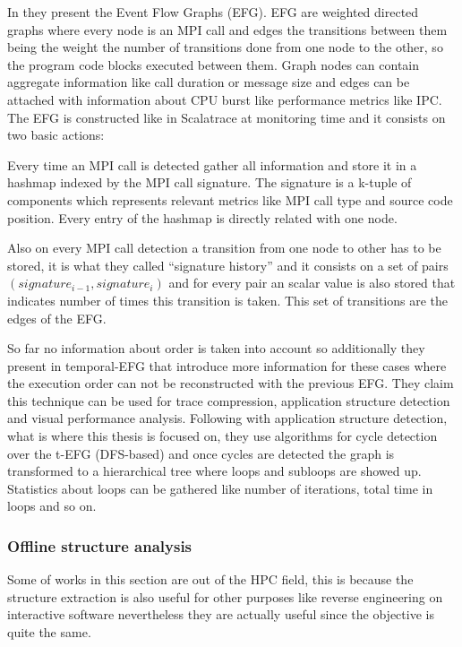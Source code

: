 In \cite{aguilar2014mpi} they present the Event Flow Graphs (EFG). EFG are
weighted directed graphs where every node is an MPI call and edges the
transitions between them being the weight the number of transitions done
from one node to the other, so the program code blocks executed between them.
Graph nodes can contain aggregate information like call duration or message size
and edges can be attached with information about CPU burst like performance
metrics like IPC. 
The EFG is constructed like in Scalatrace at monitoring time and it consists on
two basic actions: 
\begin{enumerate*}[label=\roman*)]
  \item Every time an MPI call is detected gather all information and store it
    in a hashmap indexed by the MPI call signature. The signature is a k-tuple
    of components which represents relevant metrics like MPI call type and
    source code position. Every entry of the hashmap is directly related with
    one node.
  \item Also on every MPI call detection a transition from one node to other has
    to be stored, it is what they called ``signature history'' and it consists
    on a set of pairs $(signature_{i-1}, signature_{i})$ and for every pair an
    scalar value is also stored that indicates number of times this transition
    is taken. This set of transitions are the edges of the EFG.
\end{enumerate*}

So far no information about order is taken into account
so additionally they present in \cite{aguilar2016event} temporal-EFG that 
introduce more
information for these cases where the execution order can not be reconstructed
with the previous EFG. They claim this technique can be used for trace
compression, application structure detection and visual performance analysis.
Following with application structure detection, what is where this thesis is
focused on, they use algorithms for cycle detection over the t-EFG (DFS-based)
and once cycles are detected the graph is transformed to a hierarchical tree
where loops and subloops are showed up. Statistics about loops can be gathered
like number of iterations, total time in loops and so on.

\subsubsection{Offline structure analysis}

Some of works in this section are out of the HPC field,
this is because the structure extraction is also useful for other purposes like
reverse engineering on interactive software nevertheless they are actually useful
since the objective is quite the same.


